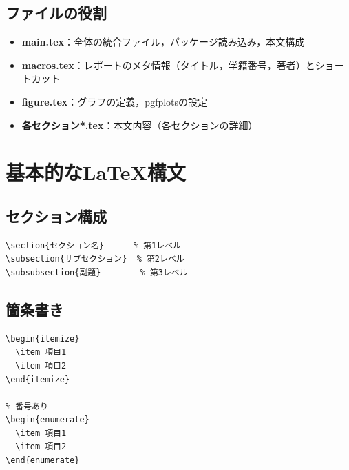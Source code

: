 \documentclass[11pt]{ltjarticle}
\begin{document}
\subsection{ファイルの役割}

\begin{itemize}
  \item \textbf{main.tex}：全体の統合ファイル，パッケージ読み込み，本文構成
  \item \textbf{macros.tex}：レポートのメタ情報（タイトル，学籍番号，著者）とショートカット
  \item \textbf{figure.tex}：グラフの定義，pgfplotsの設定
  \item \textbf{各セクション*.tex}：本文内容（各セクションの詳細）
\end{itemize}

\section{基本的なLaTeX構文}

\subsection{セクション構成}

\begin{lstlisting}[language=bash, basicstyle=\ttfamily\tiny]
\section{セクション名}      % 第1レベル
\subsection{サブセクション}  % 第2レベル
\subsubsection{副題}        % 第3レベル
\end{lstlisting}

\subsection{箇条書き}

\begin{lstlisting}[language=bash, basicstyle=\ttfamily\tiny]
% 番号なし
\begin{itemize}
  \item 項目1
  \item 項目2
\end{itemize}

% 番号あり
\begin{enumerate}
  \item 項目1
  \item 項目2
\end{enumerate}
\end{lstlisting}
\end{document}
